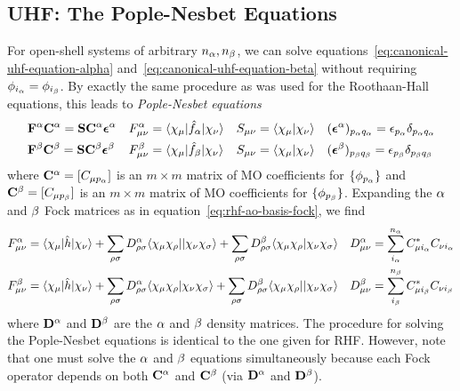 \documentclass[11pt]{article}
\numberwithin{equation}{section}
\begin{document}
\subsection{UHF: The Pople-Nesbet Equations}

For open-shell systems of arbitrary $n_{\alpha }, n_{\beta }$, we can solve equations~\ref{eq:canonical-uhf-equation-alpha} and~\ref{eq:canonical-uhf-equation-beta} without requiring $\phi _{i_{\alpha }}=\phi _{i_{\beta }}$.
By exactly the same procedure as was used for the Roothaan-Hall equations, this leads to \textit{Pople-Nesbet equations}
\begin{align*}
&
  \bo{F}^\a\bo{C}^\a
=
  \bo{S}\bo{C}^\a\bm\ev^\a
&&
  F_{\mu\nu}^\a
=
  \ip{\x_\mu|\op{f}_\a|\x_\nu}
&&
  S_{\mu\nu}
=
  \ip{\x_\mu|\x_\nu}
&&
  (\bm\ev^\a)_{p_\a q_\a}
=
  \ev_{p_\a}\d_{p_\a q_\a}
\\
&
  \bo{F}^\b\bo{C}^\b
=
  \bo{S}\bo{C}^\b\bm\ev^\b
&&
  F_{\mu\nu}^\b
=
  \ip{\x_\mu|\op{f}_\b|\x_\nu}
&&
  S_{\mu\nu}
=
  \ip{\x_\mu|\x_\nu}
&&
  (\bm\ev^\b)_{p_\b q_\b}
=
  \ev_{p_\b}\d_{p_\b q_\b}
\end{align*}
where $\bo{C}^\a=[C_{\mu p_\a}]$ is an $m\times m$ matrix of MO coefficients for $\{\phi _{p_{\alpha }}\}$ and $\bo{C}^\b=[C_{\mu p_\b}]$ is an $m\times m$ matrix of MO coefficients for $\{\phi _{p_{\beta }}\}$.
Expanding the $\alpha $ and $\beta $ Fock matrices as in equation~\ref{eq:rhf-ao-basis-fock}, we find
\begin{align*}
&
  F_{\mu\nu}^\a
=
  \ip{\x_\mu|\op{h}|\x_\nu}
+
  \sum_{\rho\si}
  D_{\rho\si}^\a
  \ip{\x_\mu\x_\rho||\x_\nu\x_\si}
+
  \sum_{\rho\si}
  D_{\rho\si}^\b
  \ip{\x_\mu\x_\rho|\x_\nu\x_\si}
&&
  D_{\mu\nu}^\a
=
  \sum_{i_\a}^{n_\a} C_{\mu i_\a}^*C_{\nu i_\a}
\\
&
  F_{\mu\nu}^\b
=
  \ip{\x_\mu|\op{h}|\x_\nu}
+
  \sum_{\rho\si}
  D_{\rho\si}^\a
  \ip{\x_\mu\x_\rho|\x_\nu\x_\si}
+
  \sum_{\rho\si}
  D_{\rho\si}^\b
  \ip{\x_\mu\x_\rho||\x_\nu\x_\si}
&&
  D_{\mu\nu}^\b
=
  \sum_{i_\b}^{n_\b} C_{\mu i_\b}^*C_{\nu i_\b}
\end{align*}
where $\mathbf{D}^{\alpha }$ and $\mathbf{D}^{\beta }$ are the $\alpha $ and $\beta $ density matrices.
The procedure for solving the Pople-Nesbet equations is identical to the one given for RHF\@.
However, note that one must solve the $\alpha $ and $\beta $ equations simultaneously because each Fock operator depends on both $\mathbf{C}^{\alpha }$ and $\mathbf{C}^{\beta }$ (via $\mathbf{D}^{\alpha }$ and $\mathbf{D}^{\beta }$).
\end{document}
